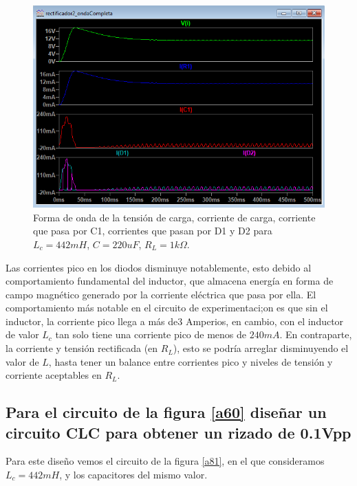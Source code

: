 \documentclass[a4paper]{IEEEtran} %
\begin{document}
\begin{figure}[!h]
	\centering
	\includegraphics[scale=0.5]{IMAGENES/a72}
	\caption{Forma de onda de la tensión de carga, corriente de carga, corriente que pasa por C1, corrientes que pasan por D1 y D2 para $L_c = 442mH$, $C = 220uF$, $R_L = 1k\Omega$.}
	\label{a72}
\end{figure}

Las corrientes pico en los diodos disminuye notablemente, esto debido al comportamiento fundamental del inductor, que almacena energía en forma de campo magnético generado por la corriente eléctrica que pasa por ella. 
El comportamiento más notable en el circuito de experimentaci;on es que sin el inductor, la corriente pico llega a más de3 Amperios, en cambio, con el inductor de valor $L_c$ tan solo tiene una corriente pico de menos de $240mA$. En contraparte, la corriente y tensión rectificada (en $R_L$), esto se podría arreglar disminuyendo el valor de $L$, hasta tener un balance entre corrientes pico y niveles de tensión y corriente aceptables en $R_L$.


\subsection{Para el circuito de la figura \eqref{a60} diseñar un circuito CLC para obtener un rizado de 0.1Vpp}

Para este diseño vemos el circuito de la figura \eqref{a81}, en el que consideramos $L_c = 442mH$, y los capacitores del mismo valor.
\end{document}
